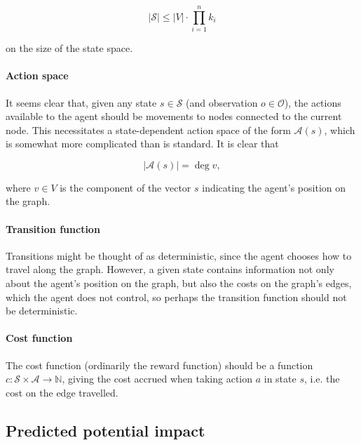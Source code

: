 \[
    \lvert \mathcal S \rvert \leq \lvert V \rvert \cdot \prod_{i = 1}^n k_i
\]

on the size of the state space.

\paragraph{Action space} It seems clear that, given any state $s \in \mathcal S$ (and observation $o \in \mathcal O$), the actions available to the agent should be movements to nodes connected to the current node. This necessitates a state-dependent action space of the form $\mathcal A(s)$, which is somewhat more complicated than is standard. It is clear that

\[
    \lvert \mathcal A(s) \rvert = \deg v,
\]

where $v \in V$ is the component of the vector $s$ indicating the agent's position on the graph.


\paragraph{Transition function} Transitions might be thought of as deterministic, since the agent chooses how to travel along the graph. However, a given state contains information not only about the agent's position on the graph, but also the costs on the graph's edges, which the agent does not control, so perhaps the transition function should not be deterministic.


\paragraph{Cost function} The cost function (ordinarily the reward function) should be a function $c \colon \mathcal S \times \mathcal A \to \mathbb N$, giving the cost accrued when taking action $a$ in state $s$, i.e. the cost on the edge travelled. %

\subsection{Predicted potential impact}

